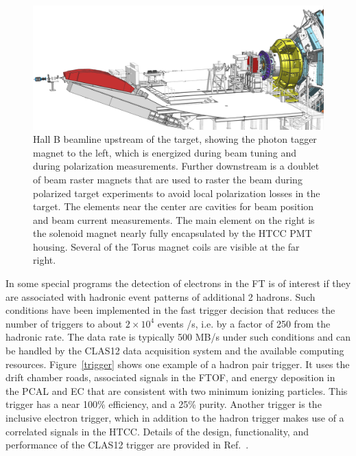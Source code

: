 \documentclass[final,3p,twocolumn]{elsarticle}
\begin{document}
\begin{figure}[htbp!]
\centerline{\includegraphics[width=2.0\columnwidth]{beamline-1.png}}
\caption{Hall B beamline upstream of the target, showing the photon tagger magnet to the left, which is energized during beam 
tuning and during polarization measurements. Further downstream is a doublet of beam raster magnets that are used 
to raster the beam during polarized target experiments to avoid local polarization losses in the target. The elements near the 
center are cavities for beam position and beam current measurements. The main element 
on the right is the solenoid magnet nearly fully encapsulated by the HTCC PMT housing. Several of the Torus 
magnet coils are visible at the far right.  }
\label{beamline-upstream}
\end{figure}

In some special programs the detection of electrons in the FT is of interest if they 
are associated with hadronic event patterns of additional 2 hadrons. Such conditions have been implemented in the 
fast trigger decision that reduces the number of triggers to about $2 \times 10^4$ events /s, i.e. by  a factor of 
250 from the hadronic rate. The data rate is typically 500 MB/s under such conditions and can be handled by 
the CLAS12 data acquisition system and the available computing resources. 
Figure~\ref{trigger} shows one example of a hadron pair trigger. It uses the drift chamber roads, associated signals in the FTOF, 
and energy deposition in the PCAL and EC that are consistent with two minimum ionizing particles. This trigger has 
 a near 100\% efficiency, and a 25\% purity. Another trigger is the inclusive electron trigger, which in addition to the hadron trigger 
 makes use of a correlated signals in the HTCC.  
Details of the design, functionality, and performance of the CLAS12 trigger are provided in  Ref.~\cite{DAQ}. 
\end{document}
